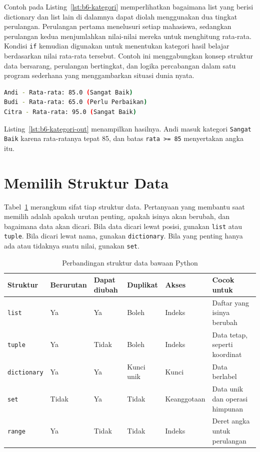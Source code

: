 Contoh pada Listing~\ref{lst:b6-kategori} memperlihatkan bagaimana list yang berisi dictionary dan list lain di dalamnya dapat diolah menggunakan dua tingkat perulangan. 
Perulangan pertama menelusuri setiap mahasiswa, sedangkan perulangan kedua menjumlahkan nilai-nilai mereka untuk menghitung rata-rata. 
Kondisi \texttt{if} kemudian digunakan untuk menentukan kategori hasil belajar berdasarkan nilai rata-rata tersebut. 
Contoh ini menggabungkan konsep struktur data bersarang, perulangan bertingkat, dan logika percabangan dalam satu program sederhana yang menggambarkan situasi dunia nyata.

\begin{lstlisting}[language=bash, caption={Keluaran kode kategori nilai}, label={lst:b6-kategori-out}]
Andi - Rata-rata: 85.0 (Sangat Baik)
Budi - Rata-rata: 65.0 (Perlu Perbaikan)
Citra - Rata-rata: 95.0 (Sangat Baik)
\end{lstlisting}

Listing~\ref{lst:b6-kategori-out} menampilkan hasilnya. Andi masuk kategori \texttt{Sangat Baik} karena rata-ratanya tepat 85, dan batas \texttt{rata >= 85} menyertakan angka itu.

\section{Memilih Struktur Data}
Tabel~\ref{tab:b6-perbandingan} merangkum sifat tiap struktur data. Pertanyaan yang membantu saat memilih adalah apakah urutan penting, apakah isinya akan berubah, dan bagaimana data akan dicari. Bila data dicari lewat posisi, gunakan \texttt{list} atau \texttt{tuple}. Bila dicari lewat nama, gunakan \texttt{dictionary}. Bila yang penting hanya ada atau tidaknya suatu nilai, gunakan \texttt{set}.

\begin{table}[H]
  \centering
  \caption{Perbandingan struktur data bawaan Python}
  \label{tab:b6-perbandingan}
  \begin{tabularx}{\textwidth}{lllllX}
    \hline
    \textbf{Struktur} & \textbf{Berurutan} & \textbf{Dapat diubah} & \textbf{Duplikat} & \textbf{Akses} & \textbf{Cocok untuk} \\
    \hline
    \texttt{list} & Ya & Ya & Boleh & Indeks & Daftar yang isinya berubah \\
    \hline
    \texttt{tuple} & Ya & Tidak & Boleh & Indeks & Data tetap, seperti koordinat \\
    \hline
    \texttt{dictionary} & Ya & Ya & Kunci unik & Kunci & Data berlabel \\
    \hline
    \texttt{set} & Tidak & Ya & Tidak & Keanggotaan & Data unik dan operasi himpunan \\
    \hline
    \texttt{range} & Ya & Tidak & Tidak & Indeks & Deret angka untuk perulangan \\
    \hline
  \end{tabularx}
\end{table}


